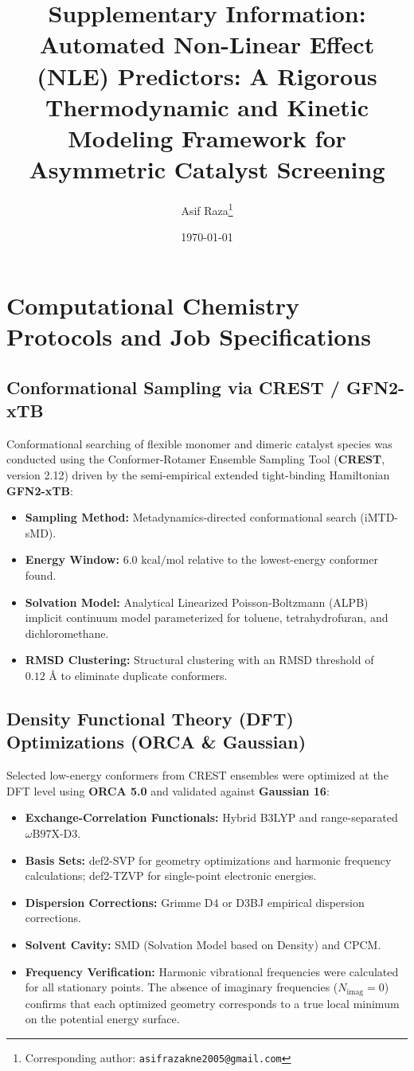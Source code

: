 \documentclass[11pt,a4paper]{article}
\title{\textbf{Supplementary Information:\\Automated Non-Linear Effect (NLE) Predictors: A Rigorous Thermodynamic and Kinetic Modeling Framework for Asymmetric Catalyst Screening}}
\author[1]{Asif Raza\thanks{Corresponding author: \texttt{asifrazakne2005@gmail.com}}}
\affil[1]{Department of Chemistry, Jamia Hamdard, New Delhi, India}
\date{\today}
\begin{document}
\maketitle

\tableofcontents
\newpage

\section{Computational Chemistry Protocols and Job Specifications}

\subsection{Conformational Sampling via CREST / GFN2-xTB}
Conformational searching of flexible monomer and dimeric catalyst species was conducted using the Conformer-Rotamer Ensemble Sampling Tool (\textbf{CREST}, version 2.12) driven by the semi-empirical extended tight-binding Hamiltonian \textbf{GFN2-xTB}:
\begin{itemize}
  \item \textbf{Sampling Method:} Metadynamics-directed conformational search (iMTD-sMD).
  \item \textbf{Energy Window:} $6.0\text{ kcal/mol}$ relative to the lowest-energy conformer found.
  \item \textbf{Solvation Model:} Analytical Linearized Poisson-Boltzmann (ALPB) implicit continuum model parameterized for toluene, tetrahydrofuran, and dichloromethane.
  \item \textbf{RMSD Clustering:} Structural clustering with an RMSD threshold of $0.12\text{ \AA}$ to eliminate duplicate conformers.
\end{itemize}

\subsection{Density Functional Theory (DFT) Optimizations (ORCA \& Gaussian)}
Selected low-energy conformers from CREST ensembles were optimized at the DFT level using \textbf{ORCA 5.0} and validated against \textbf{Gaussian 16}:
\begin{itemize}
  \item \textbf{Exchange-Correlation Functionals:} Hybrid B3LYP and range-separated $\omega\text{B97X-D3}$.
  \item \textbf{Basis Sets:} def2-SVP for geometry optimizations and harmonic frequency calculations; def2-TZVP for single-point electronic energies.
  \item \textbf{Dispersion Corrections:} Grimme D4 or D3BJ empirical dispersion corrections.
  \item \textbf{Solvent Cavity:} SMD (Solvation Model based on Density) and CPCM.
  \item \textbf{Frequency Verification:} Harmonic vibrational frequencies were calculated for all stationary points. The absence of imaginary frequencies ($N_{\text{imag}} = 0$) confirms that each optimized geometry corresponds to a true local minimum on the potential energy surface.
\end{itemize}
\end{document}
